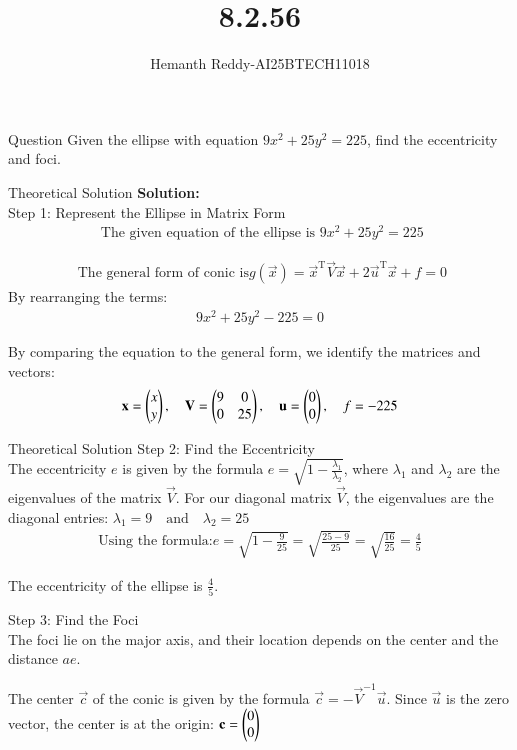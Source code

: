 \documentclass{beamer}
\title %
{ 8.2.56}
\author %
{Hemanth Reddy-AI25BTECH11018}
\begin{document}
\frame{\titlepage}
\begin{frame}{Question}
Given the ellipse with equation $9x^{2} + 25y^{2} = 225$, find the eccentricity and foci.
\end{frame}



\begin{frame}{Theoretical Solution}
\textbf{Solution:}\\
Step 1: Represent the Ellipse in Matrix Form\\
\begin{align}
   \text{ The given equation of the ellipse is }9x^2 + 25y^2 = 225
\end{align}

\begin{align}
     \text{  The general form of conic is} g(\vec{x}) = \vec{x}^{\text{T}} \vec{V} \vec{x} + 2\vec{u}^{\text{T}} \vec{x} + f = 0
\end{align}
By rearranging the terms:
\begin{align}
    9x^2 + 25y^2 - 225 = 0
\end{align}

By comparing the equation to the general form, we identify the matrices and vectors:
\begin{align}
    \mathbf{x} = \begin{pmatrix} x \\ y \end{pmatrix}, \quad \mathbf{V} = \begin{pmatrix} 9 & 0 \\ 0 & 25 \end{pmatrix}, \quad \mathbf{u} = \begin{pmatrix} 0 \\ 0 \end{pmatrix}, \quad f = -225
\end{align}



\end{frame}

\begin{frame}{Theoretical Solution}
Step 2: Find the Eccentricity\\


The eccentricity $e$ is given by the formula $e = \sqrt{1 - \frac{\lambda_1}{\lambda_2}}$, where $\lambda_1$ and $\lambda_2$ are the eigenvalues of the matrix $\vec{V}$. For our diagonal matrix $\vec{V}$, the eigenvalues are the diagonal entries:
$
\lambda_1 = 9 \quad \text{and} \quad \lambda_2 = 25
$\\
\begin{align}
    \text{Using the formula:}
e = \sqrt{1 - \frac{9}{25}} = \sqrt{\frac{25-9}{25}} = \sqrt{\frac{16}{25}} = \frac{4}{5}
\end{align}


The eccentricity of the ellipse is $\frac{4}{5}$.

Step 3: Find the Foci\\



The foci lie on the major axis, and their location depends on the center and the distance $ae$.



The center $\vec{c}$ of the conic is given by the formula $\vec{c} = -\vec{V}^{-1}\vec{u}$.
Since $\vec{u}$ is the zero vector, the center is at the origin:
$
\mathbf{c} = \begin{pmatrix} 0 \\ 0 \end{pmatrix}
$


\end{frame}
\end{document}
